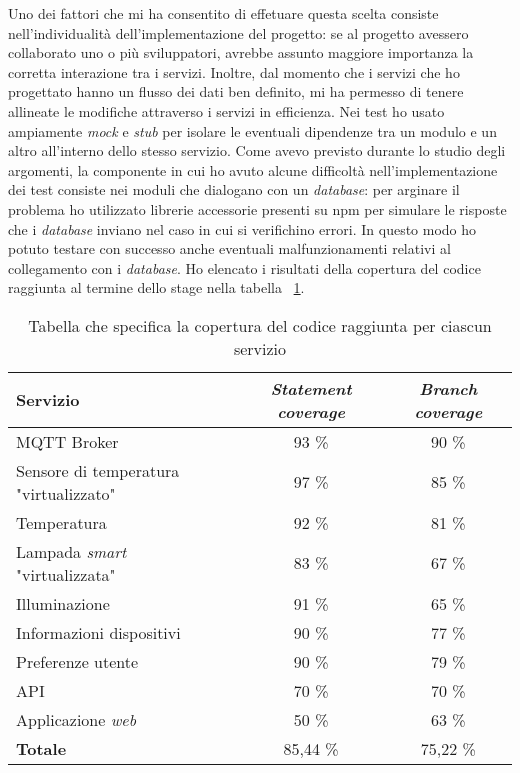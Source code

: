 Uno dei fattori che mi ha consentito di effetuare questa scelta consiste nell'individualità dell'implementazione del progetto: se al progetto avessero collaborato uno o più sviluppatori, avrebbe assunto maggiore importanza la corretta interazione tra i servizi. Inoltre, dal momento che i servizi che ho progettato hanno un flusso dei dati ben definito, mi ha permesso di tenere allineate le modifiche attraverso i servizi in efficienza.
Nei test ho usato ampiamente \emph{mock} e \emph{stub} per isolare le eventuali dipendenze tra un modulo e un altro all'interno dello stesso servizio. Come avevo previsto durante lo studio degli argomenti, la componente in cui ho avuto alcune difficoltà nell'implementazione dei test consiste nei moduli che dialogano con un \emph{database}: per arginare il problema ho utilizzato librerie accessorie presenti su npm per simulare le risposte che i \emph{database} inviano nel caso in cui si verifichino errori. In questo modo ho potuto testare con successo anche eventuali malfunzionamenti relativi al collegamento con i \emph{database}.
Ho elencato i risultati della copertura del codice raggiunta al termine dello stage nella tabella ~\ref{tab:coverage}.

\begin{table}[H]
\caption{Tabella che specifica la copertura del codice raggiunta per ciascun servizio}
\label{tab:coverage}
\begin{tabularx}{\linewidth}{|X|c|c|}
\hline
\textbf{Servizio} & \textbf{\emph{Statement coverage}} & \textbf{\emph{Branch coverage}} \\
\hline
MQTT Broker & 93 \% & 90 \% \\
\hline
Sensore di temperatura "virtualizzato" & 97 \% & 85 \% \\
\hline
Temperatura & 92 \% & 81 \% \\
\hline
Lampada \emph{smart} "virtualizzata" & 83 \% & 67 \% \\
\hline
Illuminazione & 91 \% & 65 \% \\
\hline
Informazioni dispositivi & 90 \% & 77 \% \\
\hline
Preferenze utente & 90 \% & 79 \% \\
\hline
API & 70 \% & 70 \% \\
\hline
Applicazione \emph{web} & 50 \% & 63 \% \\
\hline
\textbf{Totale} & 85,44 \% & 75,22 \% \\
\hline
\end{tabularx}
\end{table}

